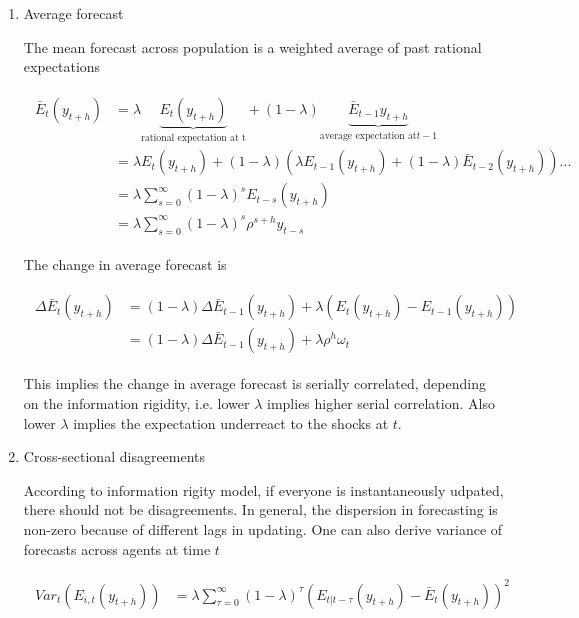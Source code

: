 \documentclass[]{article}
\begin{document}
\begin{enumerate}	
\item Average forecast

The mean forecast across population is a weighted average of past rational expectations 

\begin{eqnarray}
\begin{aligned}
\bar E_t(y_{t+h}) & = \lambda \underbrace{E_t(y_{t+h})}_{\textrm{rational expectation at t}} + (1-\lambda) \underbrace{\bar E_{t-1}{y_{t+h}}}_{\textrm{average expectation at} t-1} \\
& = \lambda E_t(y_{t+h}) + (1-\lambda) (\lambda E_{t-1}(y_{t+h})+ (1-\lambda) \bar E_{t-2}(y_{t+h}))... \\
& = \lambda \sum^{\infty}_{s=0} (1-\lambda)^s E_{t-s}(y_{t+h}) \\
& = \lambda \sum^{\infty}_{s=0} (1-\lambda)^s \rho^{s+h}y_{t-s}
\end{aligned}
\end{eqnarray}

The change in average forecast is 

\begin{eqnarray}
\begin{aligned}
\Delta \bar E_t(y_{t+h})&  = (1-\lambda) \Delta \bar E_{t-1}(y_{t+h}) + \lambda (E_t(y_{t+h}) - E_{t-1}(y_{t+h})) \\ 
& = (1-\lambda) \Delta \bar E_{t-1}(y_{t+h}) + \lambda \rho^h \omega_t 
\end{aligned}
\end{eqnarray}

This implies the change in average forecast is serially correlated, depending on the information rigidity, i.e. lower $\lambda$ implies higher serial correlation. Also lower $\lambda$ implies the expectation underreact to the shocks at $t$. 

\item Cross-sectional disagreements

According to information rigity model, if everyone is instantaneously udpated, there should not be disagreements. In general, the dispersion in forecasting is non-zero because of different lags in updating. One can also derive variance of forecasts across agents at time $t$ 

\begin{eqnarray}
\begin{aligned}
Var_t(E_{i,t}(y_{t+h}) ) & = \lambda \sum^{\infty}_{\tau=0} (1-\lambda)^{\tau} (E_{t|t-\tau}(y_{t+h}) - \bar E_t(y_{t+h}))^2  
\end{aligned}
\end{eqnarray}


\end{enumerate}
\end{document}
